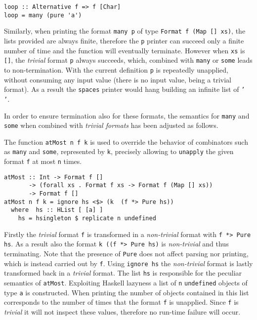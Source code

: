 \documentclass[../Thesis.tex]{subfiles}
\begin{document}
\begin{verbatim}
loop :: Alternative f => f [Char]
loop = many (pure 'a')	
\end{verbatim}

Similarly, when printing the format \texttt{many p} of type \texttt{Format f (Map [] xs)}, the lists provided are always finite, therefore the \texttt{p} printer can succeed only a finite number of time and the function will eventually terminate.
However when \texttt{xs} is \texttt{[]}, the \emph{trivial} format \texttt{p} always succeeds, which, combined with \texttt{many} or \texttt{some} leads to non-termination.
With the current definition \texttt{p} is repeatedly unapplied, without consuming any input value (there is no input value, being a trivial format).
As a result the \texttt{spaces} printer would hang building an infinite list of \texttt{' '}.

In order to ensure termination also for these formats, the semantics for \texttt{many} and \texttt{some} when combined with \emph{trivial formats} 
has been adjusted as follows. 

The function \texttt{atMost n f k} is used to override the behavior of
combinators such as \texttt{many} and \texttt{some}, represented by \texttt{k}, precisely allowing to \texttt{unapply}
 the given format \texttt{f} at most \texttt{n} times.

\begin{verbatim}
atMost :: Int -> Format f [] 
       -> (forall xs . Format f xs -> Format f (Map [] xs))
       -> Format f []
atMost n f k = ignore hs <$> (k  (f *> Pure hs))
  where  hs :: HList [ [a] ]    
    hs = hsingleton $ replicate n undefined
\end{verbatim}

Firstly the \emph{trivial} format \texttt{f} is transformed in a \emph{non-trivial} format with \texttt{f *> Pure hs}. As a result also the format \texttt{k ((f *> Pure hs)} is \emph{non-trivial} and thus terminating.
Note that the presence of \texttt{Pure} does not affect parsing nor printing, which is instead carried out by \texttt{f}. Using \texttt{ignore hs} the \emph{non-trivial} format is lastly transformed back in a \emph{trivial} format.
The list \texttt{hs} is responsible for the peculiar semantics of \texttt{atMost}.
Exploiting Haskell lazyness a list of \texttt{n} \texttt{undefined} objects of type \texttt{a} is constructed. When printing the number of objects contained in this list corresponds to the number of times that the format \texttt{f} is unapplied. Since \texttt{f} is \emph{trivial} it will not inspect these values, therefore no run-time failure will occur.
\end{document}
